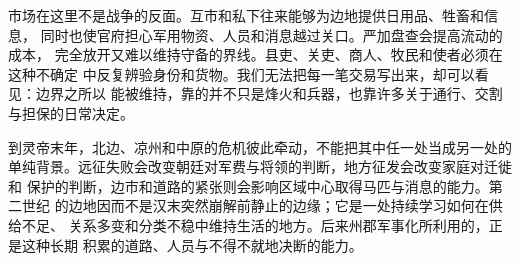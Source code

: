 市场在这里不是战争的反面。互市和私下往来能够为边地提供日用品、牲畜和信息，
同时也使官府担心军用物资、人员和消息越过关口。严加盘查会提高流动的成本，
完全放开又难以维持守备的界线。县吏、关吏、商人、牧民和使者必须在这种不确定
中反复辨验身份和货物。我们无法把每一笔交易写出来，却可以看见：边界之所以
能被维持，靠的并不只是烽火和兵器，也靠许多关于通行、交割与担保的日常决定。

到灵帝末年，北边、凉州和中原的危机彼此牵动，不能把其中任一处当成另一处的
单纯背景。远征失败会改变朝廷对军费与将领的判断，地方征发会改变家庭对迁徙和
保护的判断，边市和道路的紧张则会影响区域中心取得马匹与消息的能力。第二世纪
的边地因而不是汉末突然崩解前静止的边缘；它是一处持续学习如何在供给不足、
关系多变和分类不稳中维持生活的地方。后来州郡军事化所利用的，正是这种长期
积累的道路、人员与不得不就地决断的能力。
